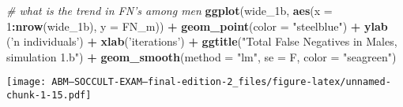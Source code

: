 \documentclass[]{article}
\newenvironment{Shaded}{\begin{snugshade}}{\end{snugshade}}
\newcommand{\KeywordTok}[1]{\textcolor[rgb]{0.13,0.29,0.53}{\textbf{#1}}}
\newcommand{\DataTypeTok}[1]{\textcolor[rgb]{0.13,0.29,0.53}{#1}}
\newcommand{\DecValTok}[1]{\textcolor[rgb]{0.00,0.00,0.81}{#1}}
\newcommand{\StringTok}[1]{\textcolor[rgb]{0.31,0.60,0.02}{#1}}
\newcommand{\CommentTok}[1]{\textcolor[rgb]{0.56,0.35,0.01}{\textit{#1}}}
\newcommand{\OperatorTok}[1]{\textcolor[rgb]{0.81,0.36,0.00}{\textbf{#1}}}
\newcommand{\NormalTok}[1]{#1}
\begin{document}
\begin{Shaded}
\begin{Highlighting}[]
\CommentTok{# what is the trend in FN's among men}
\KeywordTok{ggplot}\NormalTok{(wide_1b, }\KeywordTok{aes}\NormalTok{(}\DataTypeTok{x =} \DecValTok{1}\OperatorTok{:}\KeywordTok{nrow}\NormalTok{(wide_1b), }\DataTypeTok{y =}\NormalTok{ FN_m)) }\OperatorTok{+}\StringTok{ }
\StringTok{  }\KeywordTok{geom_point}\NormalTok{(}\DataTypeTok{color =} \StringTok{"steelblue"}\NormalTok{) }\OperatorTok{+}
\StringTok{  }\KeywordTok{ylab}\NormalTok{ (}\StringTok{'n individuals'}\NormalTok{) }\OperatorTok{+}\StringTok{ }\KeywordTok{xlab}\NormalTok{(}\StringTok{'iterations'}\NormalTok{) }\OperatorTok{+}
\StringTok{  }\KeywordTok{ggtitle}\NormalTok{(}\StringTok{"Total False Negatives in Males, simulation 1.b"}\NormalTok{) }\OperatorTok{+}
\StringTok{  }\KeywordTok{geom_smooth}\NormalTok{(}\DataTypeTok{method =} \StringTok{"lm"}\NormalTok{, }\DataTypeTok{se =}\NormalTok{ F, }\DataTypeTok{color =} \StringTok{"seagreen"}\NormalTok{)}
\end{Highlighting}
\end{Shaded}

\texttt{[image: ABM---SOCCULT-EXAM---final-edition-2\_files/figure-latex/unnamed-chunk-1-15.pdf]}
\end{document}
